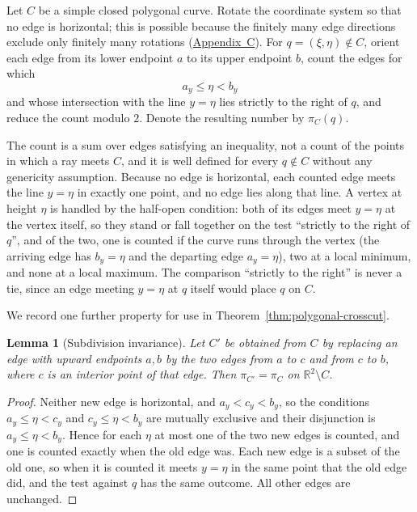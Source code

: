 \documentclass[11pt]{article}
\theoremstyle{mainplain}
\newtheorem{lemma}[theorem]{Lemma}
\theoremstyle{mainroman}
\theoremstyle{definition}
\numberwithin{equation}{section}
\begin{document}
Let $C$ be a simple closed polygonal curve. Rotate the coordinate system
so that no edge is horizontal; this is possible because the finitely many
edge directions exclude only finitely many rotations
(\hyperref[app:background]{Appendix~C}). For
$q=(\xi,\eta)\notin C$, orient each edge from its lower endpoint $a$ to
its upper endpoint $b$, count the edges for which
\[
 a_y\leq\eta<b_y
\]
and whose intersection with the line $y=\eta$ lies strictly to the
right of $q$, and reduce the count modulo $2$. Denote the resulting
number by $\pi_C(q)$.

The count is a sum over edges satisfying an inequality, not a count of
the points in which a ray meets $C$, and it is well defined for every
$q\notin C$ without any genericity assumption. Because no edge is
horizontal, each counted edge meets the line $y=\eta$ in exactly one
point, and no edge lies along that line. A vertex at height $\eta$ is
handled by the half-open condition: both of its edges meet $y=\eta$ at
the vertex itself, so they stand or fall together on the test ``strictly
to the right of $q$'', and of the two, one is counted if the curve runs
through the vertex \textup(the arriving edge has $b_y=\eta$ and the
departing edge $a_y=\eta$\textup), two at a local minimum, and none at a
local maximum. The comparison ``strictly to the right'' is never a tie,
since an edge meeting $y=\eta$ at $q$ itself would place $q$ on $C$.

We record one further property for use in
Theorem~\ref{thm:polygonal-crosscut}.

\begin{lemma}[Subdivision invariance]\label{lem:parity-subdivision}
Let $C'$ be obtained from $C$ by replacing an edge with upward endpoints
$a,b$ by the two edges from $a$ to $c$ and from $c$ to $b$, where $c$ is
an interior point of that edge. Then $\pi_{C'}=\pi_C$ on
$\mathbb R^2\setminus C$.
\end{lemma}
\begin{proof}
Neither new edge is horizontal, and $a_y<c_y<b_y$, so the conditions
$a_y\le\eta<c_y$ and $c_y\le\eta<b_y$ are mutually exclusive and their
disjunction is $a_y\le\eta<b_y$. Hence for each $\eta$ at most one of
the two new edges is counted, and one is counted exactly when the old
edge was. Each new edge is a subset of the old one, so when it is
counted it meets $y=\eta$ in the same point that the old edge did, and
the test against $q$ has the same outcome. All other edges are
unchanged.
\end{proof}
\end{document}
